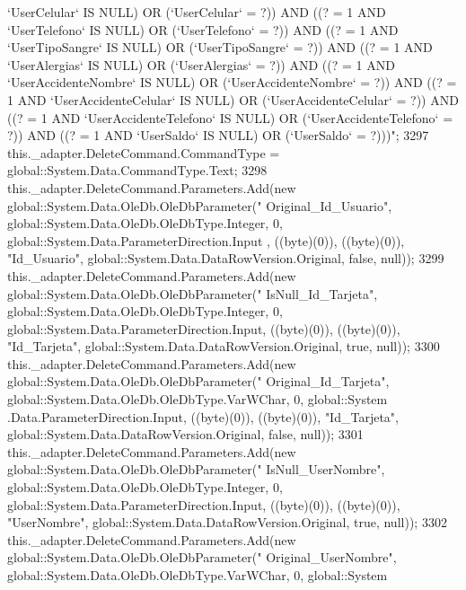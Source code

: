 \begin{DoxyCode}
{       `UserCelular` IS NULL) OR (`UserCelular` = ?)) AND ((? = 1 AND `UserTelefono` IS NULL) OR (`UserTelefono` = ?))
       AND ((? = 1 AND `UserTipoSangre` IS NULL) OR (`UserTipoSangre` = ?)) AND ((? = 1 AND `UserAlergias` IS NULL)
       OR (`UserAlergias` = ?)) AND ((? = 1 AND `UserAccidenteNombre` IS NULL) OR (`UserAccidenteNombre` = ?)) AND
       ((? = 1 AND `UserAccidenteCelular` IS NULL) OR (`UserAccidenteCelular` = ?)) AND ((? = 1 AND
       `UserAccidenteTelefono` IS NULL) OR (`UserAccidenteTelefono` = ?)) AND ((? = 1 AND `UserSaldo` IS NULL) OR (`UserSaldo` =
       ?)))"};
3297             this.\_adapter.DeleteCommand.CommandType = global::System.Data.CommandType.Text;
3298             this.\_adapter.DeleteCommand.Parameters.Add(\textcolor{keyword}{new} global::System.Data.OleDb.OleDbParameter(\textcolor{stringliteral}{"
      Original\_Id\_Usuario"}, global::System.Data.OleDb.OleDbType.Integer, 0, global::System.Data.ParameterDirection.Input
      , ((byte)(0)), ((byte)(0)), \textcolor{stringliteral}{"Id\_Usuario"}, global::System.Data.DataRowVersion.Original, \textcolor{keyword}{false}, null));
3299             this.\_adapter.DeleteCommand.Parameters.Add(\textcolor{keyword}{new} global::System.Data.OleDb.OleDbParameter(\textcolor{stringliteral}{"
      IsNull\_Id\_Tarjeta"}, global::System.Data.OleDb.OleDbType.Integer, 0, global::System.Data.ParameterDirection.Input, 
      ((byte)(0)), ((byte)(0)), \textcolor{stringliteral}{"Id\_Tarjeta"}, global::System.Data.DataRowVersion.Original, \textcolor{keyword}{true}, null));
3300             this.\_adapter.DeleteCommand.Parameters.Add(\textcolor{keyword}{new} global::System.Data.OleDb.OleDbParameter(\textcolor{stringliteral}{"
      Original\_Id\_Tarjeta"}, global::System.Data.OleDb.OleDbType.VarWChar, 0, global::System
      .Data.ParameterDirection.Input, ((byte)(0)), ((byte)(0)), \textcolor{stringliteral}{"Id\_Tarjeta"}, global::System.Data.DataRowVersion.Original, \textcolor{keyword}{false}, null));
3301             this.\_adapter.DeleteCommand.Parameters.Add(\textcolor{keyword}{new} global::System.Data.OleDb.OleDbParameter(\textcolor{stringliteral}{"
      IsNull\_UserNombre"}, global::System.Data.OleDb.OleDbType.Integer, 0, global::System.Data.ParameterDirection.Input, 
      ((byte)(0)), ((byte)(0)), \textcolor{stringliteral}{"UserNombre"}, global::System.Data.DataRowVersion.Original, \textcolor{keyword}{true}, null));
3302             this.\_adapter.DeleteCommand.Parameters.Add(\textcolor{keyword}{new} global::System.Data.OleDb.OleDbParameter(\textcolor{stringliteral}{"
      Original\_UserNombre"}, global::System.Data.OleDb.OleDbType.VarWChar, 0, global::System

\end{DoxyCode}
